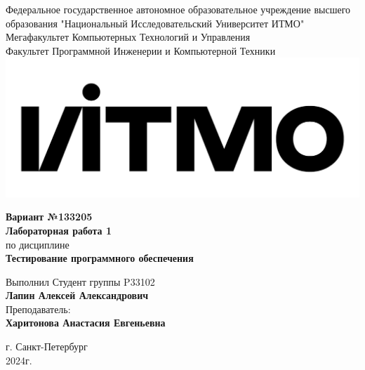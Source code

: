 \documentclass[12pt,onecolumn]{article}
\begin{document}
\setcounter{tocdepth}{4}
\begin{center}
    Федеральное государственное автономное образовательное учреждение высшего образования "Национальный Исследовательский Университет ИТМО"\\ 
    Мегафакультет Компьютерных Технологий и Управления\\
    Факультет Программной Инженерии и Компьютерной Техники \\
    \includegraphics[scale=0.3]{image/itmo.jpg} %
\end{center}
\vspace{1cm}


\begin{center}
    \large \textbf{Вариант №133205}\\
    \textbf{Лабораторная работа 1}\\
    по дисциплине\\
    \textbf{Тестирование программного обеспечения}
\end{center}

\vspace{2cm}

\begin{flushright}
  Выполнил Студент  группы P33102\\
  \textbf{Лапин Алексей Александрович}\\
  Преподаватель: \\
  \textbf{Харитонова Анастасия Евгеньевна}\\
\end{flushright}

\vspace{9cm}
\begin{center}
    г. Санкт-Петербург\\
    2024г.
\end{center}
\pagestyle{empty}

\pagestyle{plain}
\end{document}
